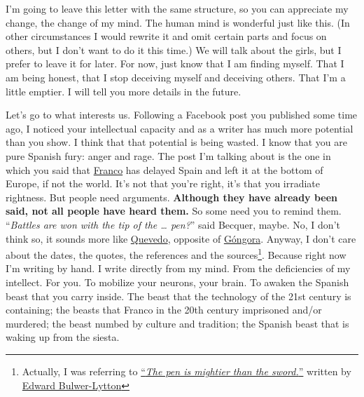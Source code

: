 \documentclass[]{book}
\let\rmarkdownfootnote\footnote%
\def\footnote{\protect\rmarkdownfootnote}
\begin{document}
I'm going to leave this letter with the same structure, so you can appreciate my change, the change of my mind. The human mind is wonderful just like this. (In other circumstances I would rewrite it and omit certain parts and focus on others, but I don't want to do it this time.) We will talk about the girls, but I prefer to leave it for later. For now, just know that I am finding myself. That I am being honest, that I stop deceiving myself and deceiving others. That I'm a little emptier. I will tell you more details in the future.

Let's go to what interests us. Following a Facebook post you published some time ago, I noticed your intellectual capacity and as a writer has much more potential than you show. I think that that potential is being wasted. I know that you are pure Spanish fury: anger and rage. The post I'm talking about is the one in which you said that \href{https://en.wikipedia.org/wiki/Francisco_Franco}{Franco} has delayed Spain and left it at the bottom of Europe, if not the world. It's not that you're right, it's that you irradiate rightness. But people need arguments. \textbf{Although they have already been said, not all people have heard them.} So some need you to remind them. ``\emph{Battles are won with the tip of the \ldots{} pen?}'' said Becquer, maybe. No, I don't think so, it sounds more like \href{https://en.wikipedia.org/wiki/Francisco_de_Quevedo}{Quevedo}, opposite of \href{https://en.wikipedia.org/wiki/Luis_de_G\%C3\%B3ngora}{Góngora}. Anyway, I don't care about the dates, the quotes, the references and the sources\footnote{Actually, I was referring to \href{https://en.wikipedia.org/wiki/The_pen_is_mightier_than_the_sword}{``\emph{The pen is mightier than the sword.}''} written by \href{https://en.wikipedia.org/wiki/Edward_Bulwer-Lytton}{Edward Bulwer-Lytton}}. Because right now I'm writing by hand. I write directly from my mind. From the deficiencies of my intellect. For you. To mobilize your neurons, your brain. To awaken the Spanish beast that you carry inside. The beast that the technology of the 21st century is containing; the beasts that Franco in the 20th century imprisoned and/or murdered; the beast numbed by culture and tradition; the Spanish beast that is waking up from the siesta.
\end{document}
